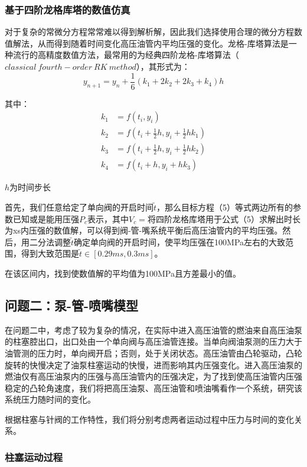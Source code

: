 \documentclass[withoutpreface,bwprint]{cumcmthesis} %
\begin{document}
{{\subsubsection{基于四阶龙格库塔的数值仿真}
对于复杂的常微分方程常常难以得到解析解，因此我们选择使用合理的微分方程数值解法，从而得到随着时间变化高压油管内平均压强的变化。龙格-库塔算法是一种流行的高精度数值方法，最常用的为经典四阶龙格-库塔算法（$classical\ fourth-order\ RK\ method$），其形式为：
\[
y_{n+1}=y_{n}+\frac{1}{6}(k_{1}+2k_{2}+2k_{3}+k_{4})h
\]

其中：
\begin{align*}
k_{1}&=f(t_{i},y_{i})\\
k_{2}&=f(t_{i}+\frac{1}{2}h,y_{i}+\frac{1}{2}hk_{1})\\
k_{3}&=f(t_{i}+\frac{1}{2}h,y_{i}+\frac{1}{2}hk_{2})\\
k_{4}&=f(t_{i}+h,y_{i}+hk_{3})
\end{align*}

$h$为时间步长

首先，我们任意给定了单向阀的开启时间$\widetilde{t}$，那么目标方程（5）等式两边所有的参数已知或是能用压强$P_c$表示，其中$V_c=$将四阶龙格库塔用于公式（5）求解出时长为xs内压强的数值解，可以得到阀-管-嘴系统平衡后高压油管内的平均压强。然后，用二分法调整$\widetilde{t}$确定单向阀的开启时间，使平均压强在100MPa左右的大致范围，得到大致范围是$\widetilde{t}\in [0.29ms,0.3ms]$。

在该区间内，找到使数值解的平均值为100MPa且方差最小的值。




 
\subsection{问题二：泵-管-喷嘴模型}
在问题二中，考虑了较为复杂的情况，在实际中进入高压油管的燃油来自高压油泵的柱塞腔出口，出口处由一个单向阀与高压油管连接。当单向阀油泵测的压力大于油管测的压力时，单向阀开启；否则，处于关闭状态。高压油管由凸轮驱动，凸轮旋转的快慢决定了油泵柱塞运动的快慢，进而影响其内压强变化。进入高压油泵的燃油仅有高压油泵内的压强与高压油管内的压强决定，为了找到使高压油管内压强稳定的凸轮角速度，我们将把高压油泵、高压油管和喷油嘴看作一个系统，研究该系统压力随时间的变化。

根据柱塞与针阀的工作特性，我们将分别考虑两者运动过程中压力与时间的变化关系。
\subsubsection{柱塞运动过程}

}}
\end{document}
